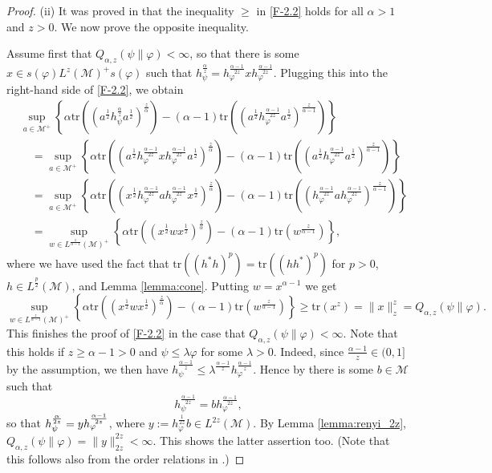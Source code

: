 \documentclass[12pt]{article}
\theoremstyle{definition}
\theoremstyle{remark}
\numberwithin{equation}{section}
\def\Me{\mathcal M}
\def\Tr{\mathrm{tr}}
\def\ffi{\varphi}
\begin{document}
\begin{proof}
\medskip
(ii)\enspace
{\color{red}It was proved in \cite[Theorem 2(vi)]{kato2023onrenyi} that the inequality $\ge$ in
\eqref{F-2.2} holds for all $\alpha>1$ and $z>0$.} We now prove the opposite inequality. 

Assume first that $Q_{\alpha,z}(\psi\|\varphi)<\infty$, so that there is some $x\in
s(\varphi)L^z(\Me)^+s(\varphi)$ such that
$h_\psi^{\frac{\alpha}{z}}=h_\varphi^{\frac{\alpha-1}{2z}}xh_\varphi^{\frac{\alpha-1}{2z}}$. Plugging this
into the right-hand side of \eqref{F-2.2}, we obtain
\begin{align}
&\sup_{a\in \Me^+} \left\{\alpha
\Tr\left((a^{\frac12}h_\psi^{\frac{\alpha}{z}}a^{\frac12})^{\frac{z}{\alpha}}\right)-(\alpha-1)
\Tr\left((a^{\frac12}h_\varphi^{\frac{\alpha-1}{2z}}a^{\frac12})^{\frac{z}{\alpha-1}}\right) \right\}
\nonumber\\
&\quad=\sup_{a\in \Me^+} \left\{\alpha
\Tr\left((a^{\frac12}h_\varphi^{\frac{\alpha-1}{2z}}xh_\varphi^{\frac{\alpha-1}{2z}}
a^{\frac12})^{\frac{z}{\alpha}}\right)-(\alpha-1)
\Tr\left((a^{\frac12}h_\varphi^{\frac{\alpha-1}{2z}}a^{\frac12})^{\frac{z}{\alpha-1}}\right) \right\}
\nonumber\\
&\quad=\sup_{a\in \Me^+} \left\{\alpha
\Tr\left((x^{\frac12}h_\varphi^{\frac{\alpha-1}{2z}}ah_\varphi^{\frac{\alpha-1}{2z}}
x^{\frac12})^{\frac{z}{\alpha}}\right)-(\alpha-1)
\Tr\left((h_\varphi^{\frac{\alpha-1}{2z}}a h_\varphi^{\frac{\alpha-1}{2z}}
)^{\frac{z}{\alpha-1}}\right)\right\}\nonumber\\
&\quad=\sup_{w\in L^{\frac{z}{\alpha-1}}(\Me)^+} \left\{\alpha
\Tr\left((x^{\frac12}wx^{\frac12})^{\frac{z}{\alpha}}\right)-(\alpha-1)
\Tr\left(w^{\frac{z}{\alpha-1}}\right)
\right\}, \label{F-2.4}
\end{align}
where we have used the fact that $\Tr\left((h^*h)^p\right)=\Tr\left((hh^*)^p\right)$ for
$p>0$, $h\in L^{\frac{p}{2}}(\Me)$, and Lemma \ref{lemma:cone}.
Putting $w=x^{\alpha-1}$ we get
\[
\sup_{w\in L^{\frac{z}{\alpha-1}}(\Me)^+} \left\{\alpha
\Tr\left((x^{\frac12}wx^{\frac12})^{\frac{z}{\alpha}}\right)-(\alpha-1)
\Tr\left(w^{\frac{z}{\alpha-1}}\right)
\right\}\ge \Tr(x^z)=\|x\|_z^z= Q_{\alpha,z}(\psi\|\varphi).
\]
This finishes the proof of \eqref{F-2.2} in the case that $Q_{\alpha,z}(\psi\|\varphi)<\infty$. Note that
this holds if $z\ge \alpha-1>0$ and $\psi\le \lambda\varphi$ for some $\lambda>0$. Indeed, since
$\frac{\alpha-1}{z}\in (0,1]$ by the assumption, we then have 
$h_\psi^{\frac{\alpha-1}{z}}\le \lambda^{\frac{\alpha-1}{z}}h_\varphi^{\frac{\alpha-1}{z}}$.
Hence by \cite[Lemma A.58]{hiai2021quantum} there is some $b\in \Me$ such that 
\[
h_\psi^{\frac{\alpha-1}{2z}}=bh_\varphi^{\frac{\alpha-1}{2z}},
\]
so that $h_\psi^{\alpha\over2z}=yh_\ffi^{\alpha-1\over2z}$, where
$y:=h_\varphi^{\frac{1}{2z}}b\in L^{2z}(\Me)$. By Lemma \ref{lemma:renyi_2z},
$Q_{\alpha,z}(\psi\|\varphi)=\|y\|_{2z}^{2z}<\infty$. This shows the latter assertion too.
(Note that this follows also from the order relations in \cite[Theorem 2(iii)]{kato2023onrenyi}.)


\end{proof}
\end{document}
